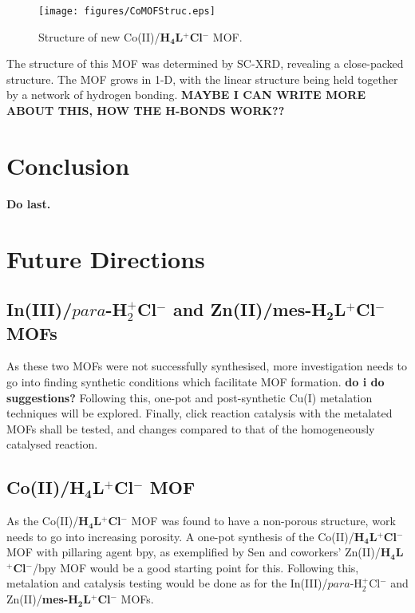 \documentclass[12pt,a4paper]{article}
\begin{document}
\begin{wrapfigure}{r}{0.5\textwidth}
\begin{center}
\texttt{[image: figures/CoMOFStruc.eps]}
\end{center}
\caption{Structure of new Co(II)/\textbf{H$\bm{_4}$L$\bm{^+}$Cl$\bm{^-}$} MOF.}\label{CoMOFStruc}
\end{wrapfigure}

The structure of this MOF was determined by SC-XRD, revealing a close-packed structure. The MOF grows in 1-D, with the linear structure being held together by a network of hydrogen bonding. \textbf{MAYBE I CAN WRITE MORE ABOUT THIS, HOW THE H-BONDS WORK??}





\section{Conclusion}\label{sec:conc}
\textbf{Do last.}

\section{Future Directions}\label{sec:future}


\subsection{In(III)/$para$-H$_2^+$Cl$^-$ and Zn(II)/\textbf{mes-H$\bm{_2}$L$\bm{^+}$Cl$\bm{^-}$} MOFs}\label{sec:in_zn-fut}
As these two MOFs were not successfully synthesised, more investigation needs to go into finding synthetic conditions which facilitate MOF formation. \textbf{do i do suggestions?} Following this, one-pot and post-synthetic Cu(I) metalation techniques will be explored. Finally, click reaction catalysis with the metalated MOFs shall be tested, and changes compared to that of the homogeneously catalysed reaction.

\subsection{Co(II)/\textbf{H$\bm{_4}$L$\bm{^+}$Cl$\bm{^-}$} MOF}\label{sec:co-fut}
As the Co(II)/\textbf{H$\bm{_4}$L$\bm{^+}$Cl$\bm{^-}$} MOF was found to have a non-porous structure, work needs to go into increasing porosity. A one-pot synthesis of the Co(II)/\textbf{H$\bm{_4}$L$\bm{^+}$Cl$\bm{^-}$} MOF with pillaring agent bpy, as exemplified by Sen and coworkers' Zn(II)/\textbf{H$\bm{_4}$L$\bm{^+}$Cl$\bm{^-}$}/bpy MOF would be a good starting point for this. Following this, metalation and catalysis testing would be done as for the In(III)/$para$-H$_2^+$Cl$^-$ and Zn(II)/\textbf{mes-H$\bm{_2}$L$\bm{^+}$Cl$\bm{^-}$} MOFs.
\end{document}
